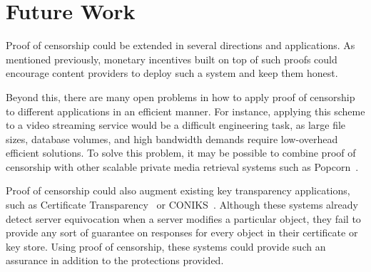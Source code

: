 



\section{Future Work}

Proof of censorship could be extended in several directions and applications. As
mentioned previously, monetary incentives built on top of such proofs could
encourage content providers to deploy such a system and keep them honest.

Beyond this, there are many open problems in how to apply proof of
censorship to different applications in an efficient manner. For instance,
applying this scheme to a video streaming service would be a difficult
engineering task, as large file sizes, database volumes, and high
bandwidth demands require low-overhead efficient solutions. To solve this problem,
it may be possible to combine proof of censorship with other
scalable private media retrieval systems such as Popcorn~\cite{popcorn}.

Proof of censorship could also augment existing key transparency applications,
such as Certificate Transparency~\cite{cert-transparency} or
CONIKS~\cite{coniks}. Although these systems already detect server equivocation
when a server modifies a particular object, they fail to provide any sort of
guarantee on responses for every object in their certificate or key store. Using
proof of censorship, these systems could provide such an assurance in addition
to the protections provided.


